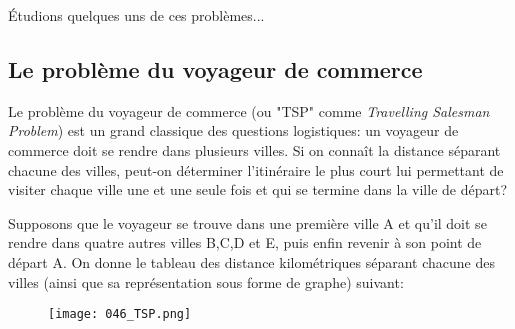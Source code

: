 \documentclass[12pt]{article}
\begin{document}
	Étudions quelques uns de ces problèmes...
	
	\subsection{Le problème du voyageur de commerce}
	
	Le problème du voyageur de commerce (ou "TSP" comme \textit{Travelling Salesman Problem}) est un grand classique des questions logistiques: un voyageur de commerce doit se rendre dans plusieurs villes. Si on connaît la distance séparant chacune des villes, peut-on déterminer l'itinéraire le plus court lui permettant de visiter chaque ville une et une seule fois et qui se termine dans la ville de départ?
	
	Supposons que le voyageur se trouve dans une première ville A et qu'il doit se rendre dans quatre autres villes B,C,D et E, puis enfin revenir à son point de départ A. On donne le tableau des distance kilométriques séparant chacune des villes (ainsi que sa représentation sous forme de graphe) suivant:
	\begin{figure}[H]
		\centering
		\texttt{[image: 046\_TSP.png]}
	\end{figure}
	
\end{document}
